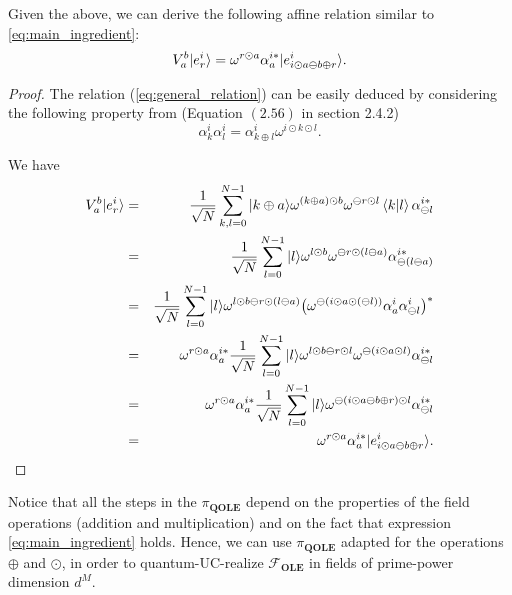 Given the above, we can derive the following affine relation similar to \eqref{eq:main_ingredient}:
\begin{equation}
V^b_a| e^i_r \rangle = \omega^{r\odot a} \alpha^{i*}_a | e^i_{i\odot a\ominus b\oplus r} \rangle.
\label{eq:general_relation}
\end{equation}
\begin{proof}
The relation (\ref{eq:general_relation}) can be easily deduced by considering the following property  from \cite{DEBZ10} (Equation $(2.56)$ in section 2.4.2)
\begin{equation*}
    \alpha^i_k \alpha^i_l = \alpha^i_{k\oplus l} \omega^{i\odot k\odot l}.
\end{equation*}



We have
\begin{eqnarray*}
V^b_a| e^i_r \rangle &=& \frac{1}{\sqrt{N}} \sum_{k,l = 0}^{N-1} | k\oplus a \rangle\omega^{(k\oplus a)\odot b}\omega^{\ominus r\odot l}\braket{k}{l} \alpha^{i*}_{\ominus l} \\
&=&\frac{1}{\sqrt{N}} \sum_{l=0}^{N-1}| l \rangle\omega^{l\odot b}\omega^{\ominus r\odot(l\ominus a)} \alpha^{i*}_{\ominus(l\ominus a)} \\
&=& \frac{1}{\sqrt{N}} \sum_{l=0}^{N-1}| l \rangle\omega^{l\odot b \ominus r\odot( l\ominus a)} \big(\omega^{\ominus(i\odot a\odot(\ominus l))} \alpha^i_a \alpha^i_{\ominus l} \big)^*\\
&=& \omega^{r\odot a}\alpha^{i*}_a \frac{1}{\sqrt{N}} \sum_{l=0}^{N-1}| l \rangle\omega^{l\odot b \ominus r\odot l} \omega^{\ominus(i\odot a\odot l)}  \alpha^{i*}_{\ominus l}\\
&=& \omega^{r\odot a}\alpha^{i*}_a \frac{1}{\sqrt{N}} \sum_{l=0}^{N-1}| l \rangle\omega^{\ominus(i\odot a\ominus b \oplus r)\odot l}  \alpha^{i*}_{\ominus l}\\
&=&\omega^{r\odot a} \alpha^{i*}_a | e^i_{i\odot a\ominus b\oplus r} \rangle.
\end{eqnarray*}
\end{proof}

Notice that all the steps in the $\pi_{\textbf{QOLE}}$ depend on the properties of the field operations (addition and multiplication) and on the fact that expression \eqref{eq:main_ingredient} holds. Hence, we can use  $\pi_{\textbf{QOLE}}$ adapted for the operations $\oplus$ and $\odot$, in order to quantum-UC-realize $\mathcal{F}_{\textbf{OLE}}$ in  fields of prime-power dimension $d^M$.

